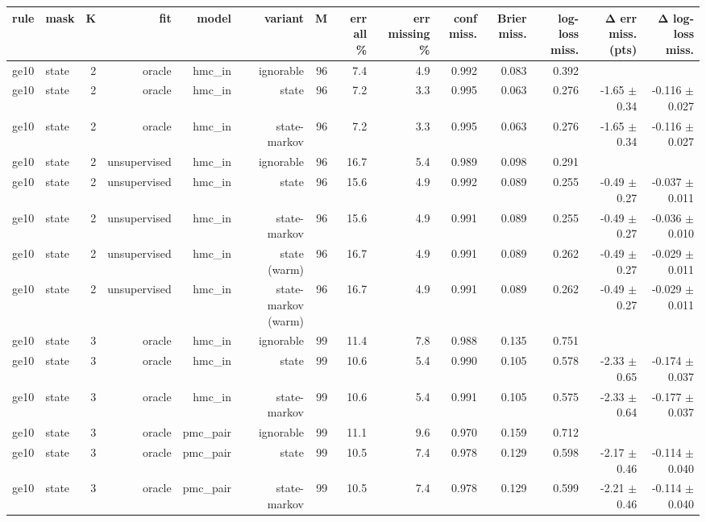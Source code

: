 \begin{table}[ht]
\centering
\small
\begin{tabular}{llrrrrrrrrrrrr}
\toprule
rule & mask & K & fit & model & variant & M & err all \% & err missing \% & conf miss. & Brier miss. & log-loss miss. & Δ err miss. (pts) & Δ log-loss miss. \\
\midrule
ge10 & state & 2 & oracle & hmc\_in & ignorable & 96 & 7.4 & 4.9 & 0.992 & 0.083 & 0.392 &  &  \\
ge10 & state & 2 & oracle & hmc\_in & state & 96 & 7.2 & 3.3 & 0.995 & 0.063 & 0.276 & -1.65 $\pm$ 0.34 & -0.116 $\pm$ 0.027 \\
ge10 & state & 2 & oracle & hmc\_in & state-markov & 96 & 7.2 & 3.3 & 0.995 & 0.063 & 0.276 & -1.65 $\pm$ 0.34 & -0.116 $\pm$ 0.027 \\
ge10 & state & 2 & unsupervised & hmc\_in & ignorable & 96 & 16.7 & 5.4 & 0.989 & 0.098 & 0.291 &  &  \\
ge10 & state & 2 & unsupervised & hmc\_in & state & 96 & 15.6 & 4.9 & 0.992 & 0.089 & 0.255 & -0.49 $\pm$ 0.27 & -0.037 $\pm$ 0.011 \\
ge10 & state & 2 & unsupervised & hmc\_in & state-markov & 96 & 15.6 & 4.9 & 0.991 & 0.089 & 0.255 & -0.49 $\pm$ 0.27 & -0.036 $\pm$ 0.010 \\
ge10 & state & 2 & unsupervised & hmc\_in & state (warm) & 96 & 16.7 & 4.9 & 0.991 & 0.089 & 0.262 & -0.49 $\pm$ 0.27 & -0.029 $\pm$ 0.011 \\
ge10 & state & 2 & unsupervised & hmc\_in & state-markov (warm) & 96 & 16.7 & 4.9 & 0.991 & 0.089 & 0.262 & -0.49 $\pm$ 0.27 & -0.029 $\pm$ 0.011 \\
ge10 & state & 3 & oracle & hmc\_in & ignorable & 99 & 11.4 & 7.8 & 0.988 & 0.135 & 0.751 &  &  \\
ge10 & state & 3 & oracle & hmc\_in & state & 99 & 10.6 & 5.4 & 0.990 & 0.105 & 0.578 & -2.33 $\pm$ 0.65 & -0.174 $\pm$ 0.037 \\
ge10 & state & 3 & oracle & hmc\_in & state-markov & 99 & 10.6 & 5.4 & 0.991 & 0.105 & 0.575 & -2.33 $\pm$ 0.64 & -0.177 $\pm$ 0.037 \\
ge10 & state & 3 & oracle & pmc\_pair & ignorable & 99 & 11.1 & 9.6 & 0.970 & 0.159 & 0.712 &  &  \\
ge10 & state & 3 & oracle & pmc\_pair & state & 99 & 10.5 & 7.4 & 0.978 & 0.129 & 0.598 & -2.17 $\pm$ 0.46 & -0.114 $\pm$ 0.040 \\
ge10 & state & 3 & oracle & pmc\_pair & state-markov & 99 & 10.5 & 7.4 & 0.978 & 0.129 & 0.599 & -2.21 $\pm$ 0.46 & -0.114 $\pm$ 0.040 \\

\end{tabular}
\end{table}
